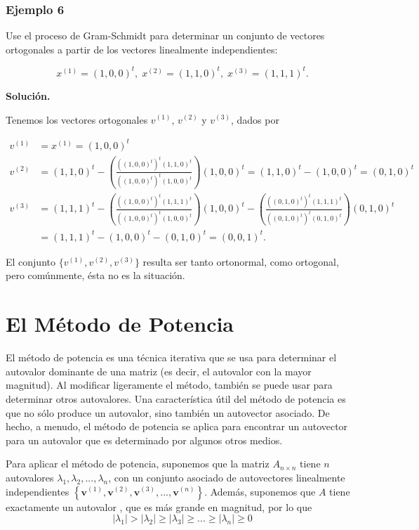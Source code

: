\documentclass{report}
\numberwithin{subsection}{section} %
\begin{document}
\subsubsection*{Ejemplo 6}

Use el proceso de Gram-Schmidt para determinar un conjunto de vectores ortogonales a partir de los vectores linealmente independientes:

$$x^{(1)} = (1, 0, 0)^t, \; x^{(2)} = (1, 1, 0)^t, \; x^{(3)} = (1, 1, 1)^t.$$

{\bf Solución.}

Tenemos los vectores ortogonales $v^{(1)}$, $v^{(2)}$ y $v^{(3)}$, dados por

\begin{align*}
    v^{(1)} &= x^{(1)} = (1, 0, 0)^t \\
    v^{(2)} &= (1, 1, 0)^t - \left(\frac{((1, 0, 0)^t)^t (1, 1, 0)^t}{((1, 0, 0)^t)^t (1, 0, 0)^t}\right) (1, 0, 0)^t = (1, 1, 0)^t - (1, 0, 0)^t = (0, 1, 0)^t \\
    v^{(3)} &= (1, 1, 1)^t - \left(\frac{((1, 0, 0)^t)^t (1, 1, 1)^t}{((1, 0, 0)^t)^t (1, 0, 0)^t}\right)(1, 0, 0)^t - \left(\frac{((0, 1, 0)^t)^t (1, 1, 1)^t}{((0, 1, 0)^t)^t (0, 1, 0)^t}\right)(0, 1, 0)^t \\
    &= (1, 1, 1)^t - (1, 0, 0)^t - (0, 1, 0)^t = (0, 0, 1)^t.
\end{align*}

El conjunto $\{v^{(1)}, v^{(2)}, v^{(3)}\}$ resulta ser tanto ortonormal, como ortogonal, pero comúnmente, ésta no es la situación.

\section{\textnormal{El Método de Potencia}}

El método de potencia es una técnica iterativa que se usa para determinar el autovalor dominante de una matriz (es decir, el autovalor con la mayor magnitud). Al modificar ligeramente el método, también se puede usar para determinar otros autovalores. Una característica útil del método de potencia es que no sólo produce un autovalor, sino también un autovector asociado. De hecho, a menudo, el método de potencia se aplica para encontrar un autovector para un autovalor que es determinado por algunos otros medios.

Para aplicar el método de potencia, suponemos que la matriz $A_{n\times n}$ tiene $n$ autovalores $\lambda_{1}, \lambda_{2}, ..., \lambda_{n}$, con un conjunto asociado de autovectores linealmente independientes $\left\{ \textbf{v}^{\left( 1 \right)}, \textbf{v}^{\left( 2 \right)}, \textbf{v}^{\left( 3 \right)}, ..., \textbf{v}^{\left( n \right)} \right\}$. Además, suponemos que $A$ tiene exactamente un autovalor , que es más grande en magnitud, por lo que
\begin{equation*}
\left| \lambda_{1} \right| > \left| \lambda_{2} \right| \ge \left| \lambda_{3} \right| \ge ... \ge \left| \lambda_{n} \right| \ge 0
\end{equation*}
\end{document}

